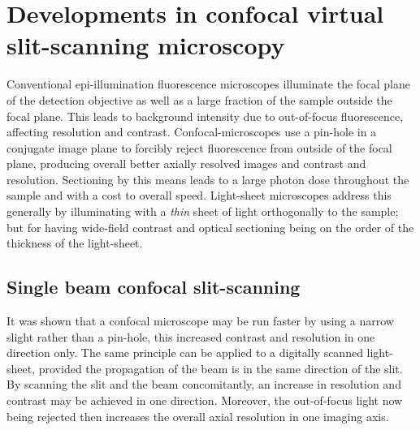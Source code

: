 \ifpdf
    \graphicspath{{Chapters/dualslit/Figs/Raster/}{Chapters/dualslit/Figs/PDF/}{Chapters/dualslit/Figs/}}
\else
    \graphicspath{{Chapters/dualslit/Figs/Vector/}{Chapters/dualslit/Figs/}}
\fi

\chapter{Developments in confocal virtual slit-scanning microscopy}


Conventional epi-illumination fluorescence microscopes illuminate the focal plane of the detection objective as well as a large fraction of the sample outside the focal plane.
This leads to background intensity due to out-of-focus fluorescence, affecting resolution and contrast.
Confocal-microscopes use a pin-hole in a conjugate image plane to forcibly reject fluorescence from outside of the focal plane, producing overall better axially resolved images and contrast and resolution.
Sectioning by this means leads to a large photon dose throughout the sample and with a cost to overall speed.
Light-sheet microscopes address this generally by illuminating with a \emph{thin} sheet of light orthogonally to the sample; but for having wide-field contrast and optical sectioning being on the order of the thickness of the light-sheet.

\section{Single beam confocal slit-scanning}

It was shown that a confocal microscope may be run faster by using a narrow slight rather than a pin-hole, this increased contrast and resolution in one direction only.
The same principle can be applied to a digitally scanned light-sheet, provided the propagation of the beam is in the same direction of the slit.
By scanning the slit and the beam concomitantly, an increase in resolution and contrast may be achieved in one direction.
Moreover, the out-of-focus light now being rejected then increases the overall axial resolution in one imaging axis.

